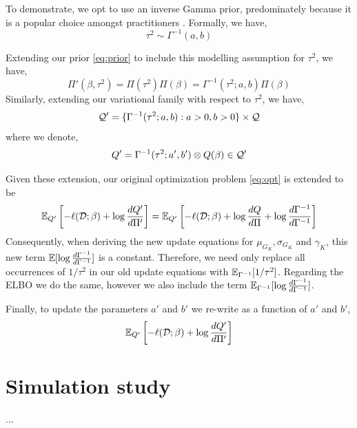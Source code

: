 \documentclass[12pt]{article}
\begin{document}
To demonstrate, we opt to use an inverse Gamma prior, predominately because it is a popular choice amongst practitioners \citep{Browne2006}. Formally, we have,
\begin{equation}
    \tau^2 \sim \Gamma^{-1}(a, b)
\end{equation}

Extending our prior \eqref{eq:prior} to include this modelling assumption for $\tau^2$, we have,
\begin{equation}
    \Pi'(\beta, \tau^2) = \Pi(\tau^2) \Pi(\beta) = \Gamma^{-1}(\tau^2; a, b) \Pi(\beta)
\end{equation}
Similarly, extending our variational family with respect to $\tau^2$, we have,
\begin{equation}
    \mathcal{Q}' = \{ \Gamma^{-1}(\tau^2; a, b) : a > 0, b > 0 \} \times \mathcal{Q}
\end{equation}
where we denote,
\begin{equation}
    Q' = \Gamma^{-1}(\tau^2; a', b') \otimes Q(\beta) \in \mathcal{Q}' 
\end{equation}

Given these extension, our original optimization problem \eqref{eq:opt} is extended to be
\begin{equation}
    \mathbb{E}_{Q'} \left[ -\ell(\mathcal{D}; \beta) + \log \frac{dQ'}{d\Pi'} \right] = 
    \mathbb{E}_{Q'} \left[ -\ell(\mathcal{D}; \beta) + \log \frac{dQ}{d\Pi} + \log \frac{d\Gamma^{-1}}{d \Gamma^{-1}}\right]
\end{equation}
Consequently, when deriving the new update equations for $\mu_{G_K}, \sigma_{G_K}$ and $\gamma_K$, this new term $ \mathbb{E} [ \log \frac{d\Gamma^{-1}}{d\Gamma^{-1}} ] $ is a constant. Therefore, we need only replace all occurrences of $1/\tau^2$ in our old update equations with $\mathbb{E}_{\Gamma^{-1}} [ 1 / \tau^2 ] $. Regarding the ELBO we do the same, however we also include the term $ \mathbb{E}_{\Gamma^{-1}} [ \log \frac{d\Gamma^{-1}}{d\Gamma^{-1}}] $.

Finally, to update the parameters $a'$ and $b'$ we re-write as a function of $a'$ and $b'$,
\begin{equation}
    \mathbb{E}_{Q'} \left[ -\ell(\mathcal{D}; \beta) + \log \frac{dQ'}{d\Pi'} \right]
\end{equation}

\newpage
\section{Simulation study}

...
\end{document}
